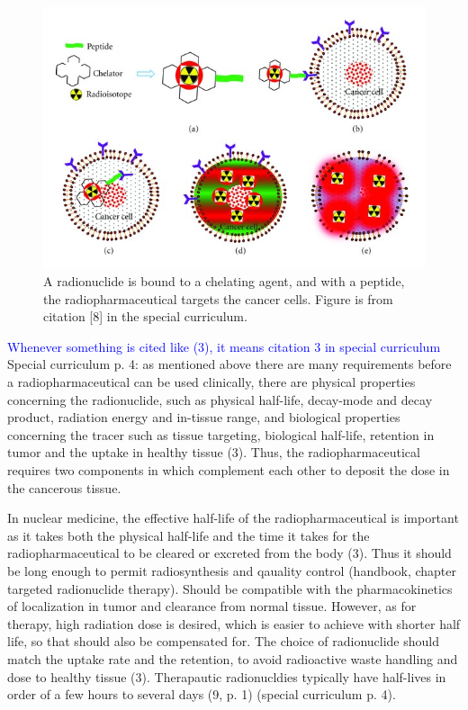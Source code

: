 \begin{figure}
    \centering
    \includegraphics[width=12cm\textwidth]{Theory/therapy-peptide.jpg}
    \caption{A radionuclide is bound to a chelating agent, and with a peptide, the radiopharmaceutical targets the cancer cells. Figure is from citation [8] in the special curriculum. }
    \label{fig:therapy_chelator_peptide}
\end{figure}

\noindent    \textcolor{blue}{Whenever something is cited like (3), it means citation 3 in special curriculum}
Special curriculum p. 4: as mentioned above there are many requirements before a radiopharmaceutical can be used clinically, there are physical properties concerning the radionuclide, such as physical half-life, decay-mode and decay product, radiation energy and in-tissue range, and biological properties concerning the tracer such as tissue targeting, biological half-life, retention in tumor and the uptake in healthy tissue (3).  Thus, the radiopharmaceutical requires two components in which complement each other to deposit the dose in the cancerous tissue. 

In nuclear medicine, the effective half-life of the radiopharmaceutical is important as it takes both the physical half-life and the time it takes for the radiopharmaceutical to be cleared or excreted from the body (3). Thus it should be long enough to permit radiosynthesis and qauality control (handbook, chapter targeted radionuclide therapy). Should be compatible with the pharmacokinetics of localization in tumor and clearance from normal tissue. However, as for therapy, high radiation dose is desired, which is easier to achieve with shorter half life, so that should also be compensated for. The choice of radionuclide should match the uptake rate and the retention, to avoid radioactive waste handling and dose to healthy tissue (3). Therapautic radionucldies typically have half-lives  in order of a few hours to several days (9, p. 1) (special curriculum p. 4).\\

